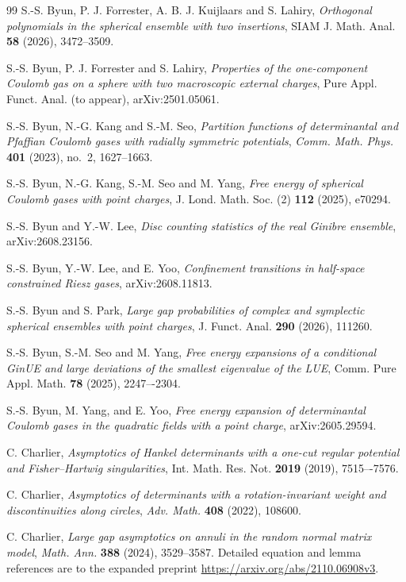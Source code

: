 \documentclass[a4paper]{article}
\numberwithin{equation}{section}
\begin{document}
\begin{thebibliography}{99}
S.-S. Byun, P. J. Forrester, A. B. J. Kuijlaars and S. Lahiry, \emph{Orthogonal polynomials in the spherical ensemble with two insertions}, SIAM J. Math. Anal. \textbf{58} (2026), 3472--3509.

S.-S. Byun, P. J. Forrester and S. Lahiry, \emph{Properties of the one-component Coulomb gas on a sphere with two macroscopic external charges}, Pure Appl. Funct. Anal. (to appear), arXiv:2501.05061.

 S.-S. Byun, N.-G. Kang and S.-M. Seo, \emph{Partition functions of determinantal and Pfaffian Coulomb gases with radially symmetric potentials}, \textit{Comm. Math. Phys.} \textbf{401} (2023), no.~2, 1627--1663.

S.-S. Byun, N.-G. Kang, S.-M. Seo and M. Yang, \emph{Free energy of spherical Coulomb gases with point charges}, J. Lond. Math. Soc. (2) \textbf{112} (2025), e70294.


S.-S. Byun and Y.-W. Lee,
\emph{Disc counting statistics of the real Ginibre ensemble}, arXiv:2608.23156.

S.-S. Byun, Y.-W. Lee, and E. Yoo,
\emph{Confinement transitions in half-space constrained Riesz gases}, arXiv:2608.11813.


S.-S. Byun and S. Park, \emph{Large gap probabilities of complex and symplectic spherical ensembles with point charges}, J. Funct. Anal. \textbf{290} (2026), 111260.

S.-S. Byun, S.-M. Seo and M. Yang, \emph{Free energy expansions of a conditional GinUE and large deviations of the smallest eigenvalue of the LUE}, Comm. Pure Appl. Math. \textbf{78} (2025), 2247–-2304.

S.-S. Byun, M. Yang, and E. Yoo, \emph{Free energy expansion of determinantal Coulomb gases in the quadratic fields with a point charge}, arXiv:2605.29594.

C. Charlier, \emph{Asymptotics of Hankel determinants with a one-cut regular potential and Fisher–Hartwig singularities}, Int. Math. Res. Not. \textbf{2019} (2019), 7515–-7576.


C. Charlier,
\emph{Asymptotics of determinants with a rotation-invariant weight and discontinuities along circles},
\textit{Adv. Math.} \textbf{408} (2022), 108600.

C. Charlier,
\emph{Large gap asymptotics on annuli in the random normal matrix model},
\textit{Math. Ann.} \textbf{388} (2024), 3529--3587.
Detailed equation and lemma references are to the expanded preprint
\url{https://arxiv.org/abs/2110.06908v3}.


\end{thebibliography}
\end{document}

